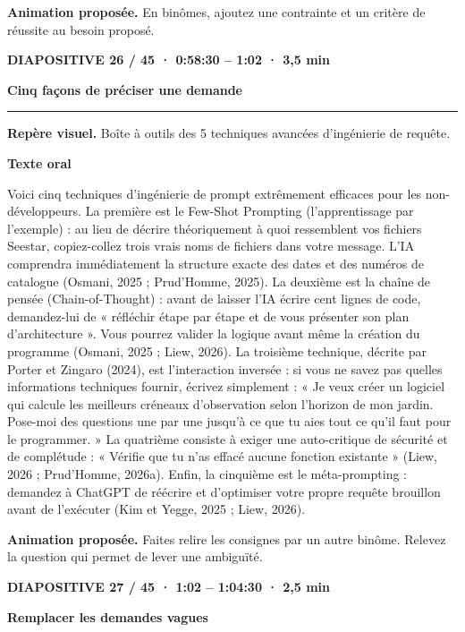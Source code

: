 \documentclass[10pt,letterpaper]{article}
\newcommand{\repere}[1]{\textcolor{accent}{\bfseries #1}\par}
\begin{document}
\smallskip\textbf{Animation proposée.} En binômes, ajoutez une contrainte et un critère de réussite au besoin proposé.

\clearpage\repere{DIAPOSITIVE 26 / 45 · 0:58:30 – 1:02 · 3,5 min}

{\Large\bfseries Cinq façons de préciser une demande\par}

\smallskip\hrule\smallskip

{\small\textbf{Repère visuel.} Boîte à outils des 5 techniques avancées d'ingénierie de requête.\par}

\par\medskip\repere{Texte oral}

Voici cinq techniques d'ingénierie de prompt extrêmement efficaces pour les non-développeurs. La première est le Few-Shot Prompting (l'apprentissage par l'exemple) : au lieu de décrire théoriquement à quoi ressemblent vos fichiers Seestar, copiez-collez trois vrais noms de fichiers dans votre message. L'IA comprendra immédiatement la structure exacte des dates et des numéros de catalogue (Osmani, 2025 ; Prud'Homme, 2025). La deuxième est la chaîne de pensée (Chain-of-Thought) : avant de laisser l'IA écrire cent lignes de code, demandez-lui de « réfléchir étape par étape et de vous présenter son plan d'architecture ». Vous pourrez valider la logique avant même la création du programme (Osmani, 2025 ; Liew, 2026). La troisième technique, décrite par Porter et Zingaro (2024), est l'interaction inversée : si vous ne savez pas quelles informations techniques fournir, écrivez simplement : « Je veux créer un logiciel qui calcule les meilleurs créneaux d'observation selon l'horizon de mon jardin. Pose-moi des questions une par une jusqu'à ce que tu aies tout ce qu'il faut pour le programmer. » La quatrième consiste à exiger une auto-critique de sécurité et de complétude : « Vérifie que tu n'as effacé aucune fonction existante » (Liew, 2026 ; Prud'Homme, 2026a). Enfin, la cinquième est le méta-prompting : demandez à ChatGPT de réécrire et d'optimiser votre propre requête brouillon avant de l'exécuter (Kim et Yegge, 2025 ; Liew, 2026).\par

\smallskip\textbf{Animation proposée.} Faites relire les consignes par un autre binôme. Relevez la question qui permet de lever une ambiguïté.

\clearpage\repere{DIAPOSITIVE 27 / 45 · 1:02 – 1:04:30 · 2,5 min}

{\Large\bfseries Remplacer les demandes vagues\par}
\end{document}
